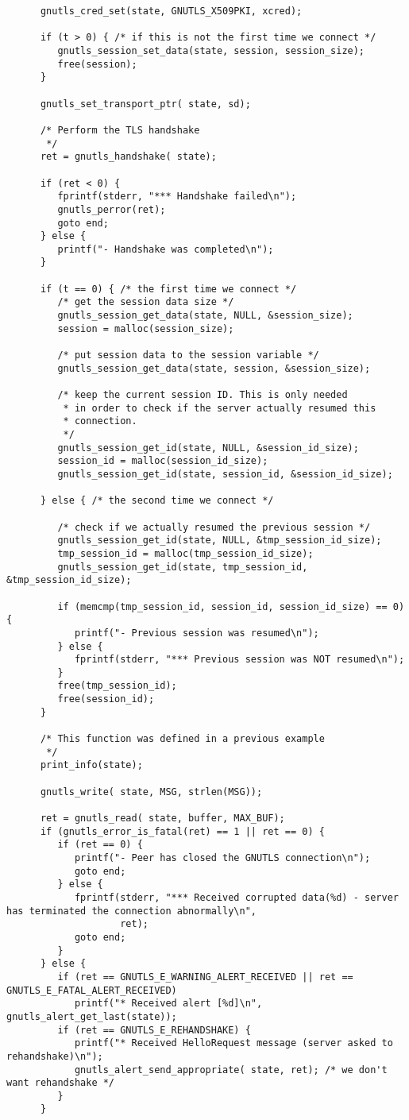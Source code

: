 \begin{verbatim}
      gnutls_cred_set(state, GNUTLS_X509PKI, xcred);

      if (t > 0) { /* if this is not the first time we connect */
         gnutls_session_set_data(state, session, session_size);
         free(session);
      }
      
      gnutls_set_transport_ptr( state, sd);

      /* Perform the TLS handshake
       */
      ret = gnutls_handshake( state);

      if (ret < 0) {
         fprintf(stderr, "*** Handshake failed\n");
         gnutls_perror(ret);
         goto end;
      } else {
         printf("- Handshake was completed\n");
      }

      if (t == 0) { /* the first time we connect */
         /* get the session data size */
         gnutls_session_get_data(state, NULL, &session_size);
         session = malloc(session_size);

         /* put session data to the session variable */
         gnutls_session_get_data(state, session, &session_size);

         /* keep the current session ID. This is only needed
          * in order to check if the server actually resumed this
          * connection.
          */
         gnutls_session_get_id(state, NULL, &session_id_size);
         session_id = malloc(session_id_size);
         gnutls_session_get_id(state, session_id, &session_id_size);

      } else { /* the second time we connect */

         /* check if we actually resumed the previous session */
         gnutls_session_get_id(state, NULL, &tmp_session_id_size);
         tmp_session_id = malloc(tmp_session_id_size);
         gnutls_session_get_id(state, tmp_session_id, &tmp_session_id_size);

         if (memcmp(tmp_session_id, session_id, session_id_size) == 0) {
            printf("- Previous session was resumed\n");
         } else {
            fprintf(stderr, "*** Previous session was NOT resumed\n");
         }
         free(tmp_session_id);
         free(session_id);
      }

      /* This function was defined in a previous example
       */
      print_info(state);

      gnutls_write( state, MSG, strlen(MSG));

      ret = gnutls_read( state, buffer, MAX_BUF);
      if (gnutls_error_is_fatal(ret) == 1 || ret == 0) {
         if (ret == 0) {
            printf("- Peer has closed the GNUTLS connection\n");
            goto end;
         } else {
            fprintf(stderr, "*** Received corrupted data(%d) - server has terminated the connection abnormally\n",
                    ret);
            goto end;
         }
      } else {
         if (ret == GNUTLS_E_WARNING_ALERT_RECEIVED || ret == GNUTLS_E_FATAL_ALERT_RECEIVED)
            printf("* Received alert [%d]\n", gnutls_alert_get_last(state));
         if (ret == GNUTLS_E_REHANDSHAKE) {
            printf("* Received HelloRequest message (server asked to rehandshake)\n");
            gnutls_alert_send_appropriate( state, ret); /* we don't want rehandshake */
         }
      }


\end{verbatim}
